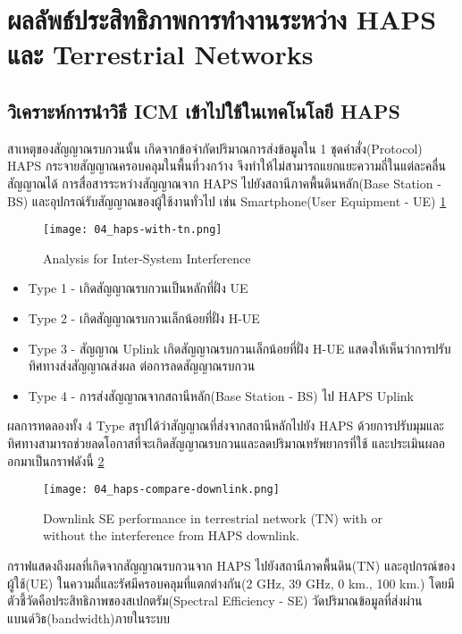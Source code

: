 \section{ผลลัพธ์ประสิทธิภาพการทำงานระหว่าง HAPS และ Terrestrial Networks}
\subsection{วิเคราะห์การนำวิธี ICM เข้าไปใช้ในเทคโนโลยี HAPS}
สาเหตุของสัญญาณรบกวนนั้น เกิดจากข้อจำกัดปริมาณการส่งข้อมูลใน 1 ชุดคำสั่ง(Protocol)
HAPS กระจายสัญญาณครอบคลุมในพื้นที่วงกว้าง จึงทำให้ไม่สามารถแยกแยะความถี่ในแต่ละคลื่นสัญญาณได้
การสื่อสารระหว่างสัญญาณจาก HAPS ไปยังสถานีภาคพื้นดินหลัก(Base Station - BS)
และอุปกรณ์รับสัญญาณของผู้ใช้งานทั่วไป เช่น Smartphone(User Equipment - UE) \ref{fig:04-haps-with-tn} 

\begin{figure}[h]
\centering
\caption[Interference Type]{Analysis for Inter-System Interference} 
\label{fig:04-haps-with-tn} 
\texttt{[image: 04\_haps-with-tn.png]}
\end{figure}

\begin{itemize}
    \item Type 1 - เกิดสัญญาณรบกวนเป็นหลักที่ฝั่ง UE
    \item Type 2 - เกิดสัญญาณรบกวนเล็กน้อยที่ฝั่ง H-UE
    \item Type 3 - สัญญาณ Uplink เกิดสัญญาณรบกวนเล็กน้อยที่ฝั่ง H-UE แสดงให้เห็นว่าการปรับทิศทางส่งสัญญาณส่งผล
    ต่อการลดสัญญาณรบกวน
    \item Type 4 - การส่งสัญญาณจากสถานีหลัก(Base Station - BS) ไป HAPS Uplink
\end{itemize}

ผลการทดลองทั้ง 4 Type สรุปได้ว่าสัญญาณที่ส่งจากสถานีหลักไปยัง HAPS ด้วยการปรับมุมและทิศทางสามารถช่วยลดโอกาสที่จะเกิดสัญญาณรบกวนและลดปริมาณทรัพยากรที่ใช้ และประเมินผลออกมาเป็นกราฟดังนี้
\ref{fig:04-haps-compare-downlink}

\begin{figure}[h]
\centering
\caption[HAPS compare with downlink]{Downlink SE performance in terrestrial network (TN) with or without
the interference from HAPS downlink.} 
\label{fig:04-haps-compare-downlink}
\texttt{[image: 04\_haps-compare-downlink.png]}
\end{figure}

กราฟแสดงถึงผลที่เกิดจากสัญญาณรบกวนจาก HAPS ไปยังสถานีภาคพื้นดิน(TN) และอุปกรณ์ของผู้ใช้(UE)
ในความถี่และรัศมีครอบคลุมที่แตกต่างกัน(2 GHz, 39 GHz, 0 km., 100 km.) โดยมีตัวชี้วัดคือประสิทธิภาพของสเปกตรัม(Spectral Efficiency - SE)
วัดปริมาณข้อมูลที่ส่งผ่านแบนด์วิธ(bandwidth)ภายในระบบ

